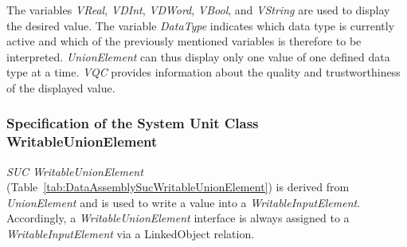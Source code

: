 The variables \emph{VReal}, \emph{VDInt}, \emph{VDWord}, \emph{VBool}, and \emph{VString } are used to display the desired value. The variable \emph{DataType} indicates which data type is currently active and which of the previously mentioned variables is therefore to be interpreted. \emph{UnionElement} can thus display only one value of one defined data type at a time. \emph{VQC} provides information about the quality and trustworthiness of the displayed value.

\subsubsection{Specification of the System Unit Class WritableUnionElement}

\emph{SUC WritableUnionElement} (Table~\ref{tab:DataAssemblySucWritableUnionElement}) is derived from \emph{UnionElement} and is used to write a value into a \emph{WritableInputElement}. Accordingly, a \emph{WritableUnionElement} interface is always assigned to a \emph{WritableInputElement} via a LinkedObject relation. 

